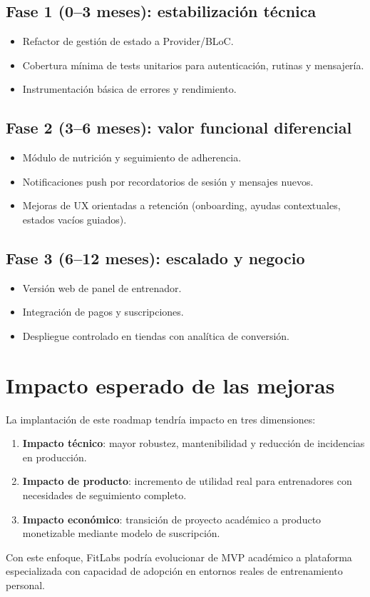 \subsection*{Fase 1 (0--3 meses): estabilización técnica}
\begin{itemize}
  \item Refactor de gestión de estado a Provider/BLoC.
  \item Cobertura mínima de tests unitarios para autenticación, rutinas y mensajería.
  \item Instrumentación básica de errores y rendimiento.
\end{itemize}

\subsection*{Fase 2 (3--6 meses): valor funcional diferencial}
\begin{itemize}
  \item Módulo de nutrición y seguimiento de adherencia.
  \item Notificaciones push por recordatorios de sesión y mensajes nuevos.
  \item Mejoras de UX orientadas a retención (onboarding, ayudas contextuales, estados vacíos guiados).
\end{itemize}

\subsection*{Fase 3 (6--12 meses): escalado y negocio}
\begin{itemize}
  \item Versión web de panel de entrenador.
  \item Integración de pagos y suscripciones.
  \item Despliegue controlado en tiendas con analítica de conversión.
\end{itemize}

\section{Impacto esperado de las mejoras}

La implantación de este roadmap tendría impacto en tres dimensiones:

\begin{enumerate}
  \item \textbf{Impacto técnico}: mayor robustez, mantenibilidad y reducción de incidencias en producción.
  \item \textbf{Impacto de producto}: incremento de utilidad real para entrenadores con necesidades de seguimiento completo.
  \item \textbf{Impacto económico}: transición de proyecto académico a producto monetizable mediante modelo de suscripción.
\end{enumerate}

Con este enfoque, FitLabs podría evolucionar de MVP académico a plataforma especializada con capacidad de adopción en entornos reales de entrenamiento personal.
